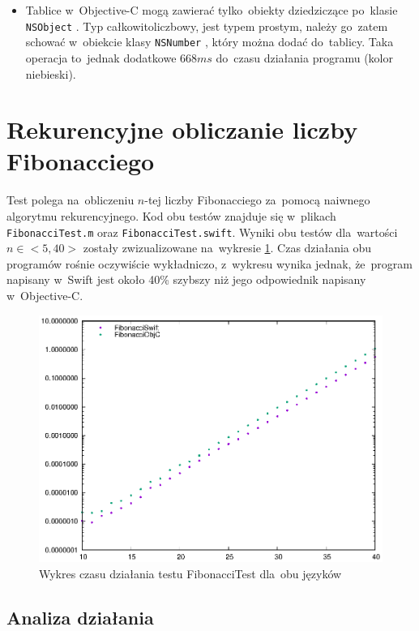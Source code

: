 \documentclass[mgr, shortabstract]{iithesis}
\newcommand{\objcinline}[1]{
    \texttt{#1}
}
\begin{document}
\begin{itemize}
    \item Tablice w~Objective-C mogą zawierać tylko~obiekty dziedziczące po~klasie \objcinline{NSObject}. Typ całkowitoliczbowy, jest typem prostym, należy go~zatem schować w~obiekcie klasy \objcinline{NSNumber}, który można dodać do~tablicy. Taka operacja to~jednak dodatkowe $668ms$ do~czasu działania programu (kolor niebieski).
\end{itemize}

\section{Rekurencyjne obliczanie liczby Fibonacciego}
\label{s:fibonacci}

Test polega na~obliczeniu $n$-tej liczby Fibonacciego za~pomocą naiwnego algorytmu rekurencyjnego. Kod obu testów znajduje się w~plikach \texttt{FibonacciTest.m} oraz \texttt{FibonacciTest.swift}. Wyniki obu testów dla~wartości $n \in <5, 40>$ zostały zwizualizowane na~wykresie \ref{p:fibonacci}. Czas działania obu programów rośnie oczywiście wykładniczo, z~wykresu wynika jednak, że~program napisany w~Swift jest około 40\% szybszy niż jego odpowiednik napisany w~Objective-C.

\begin{figure}[h]
    \includegraphics{plots/Fibonacci.eps}
    \caption{Wykres czasu działania testu FibonacciTest dla~obu języków}
    \label{p:fibonacci}
\end{figure}

\subsection{Analiza działania}
\end{document}
